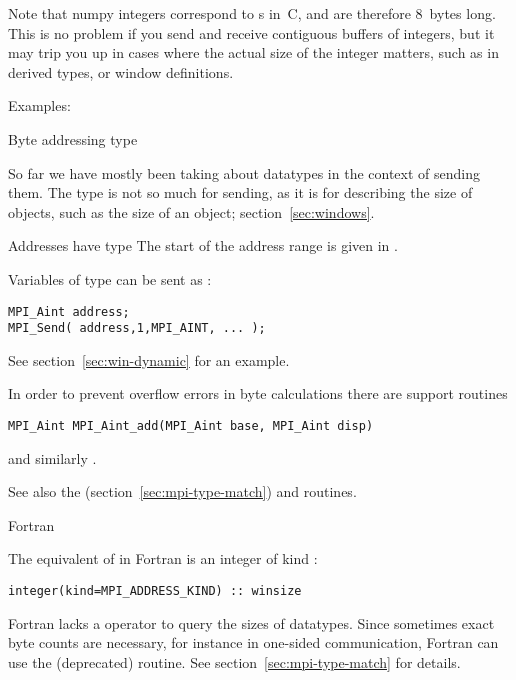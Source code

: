 Note that numpy integers correspond to s in~C,
and are therefore 8~bytes long.
This is no problem if you send and receive contiguous buffers of integers,
but it may trip you up in cases where the actual size of the integer matters,
such as in derived types, or window definitions.

Examples:



 {Byte addressing type}
\label{sec:mpi-byte-type}

So far we have mostly been taking about datatypes in the context of
sending them. The  type is not so much for
sending, as it is for describing the size of objects, such as the size
of an  object; section~\ref{sec:windows}.

Addresses have type  The start of the address range is
given in .

Variables of type  can be sent as :
\begin{lstlisting}
MPI_Aint address;
MPI_Send( address,1,MPI_AINT, ... );
\end{lstlisting}
See section~\ref{sec:win-dynamic} for an example.

In order to prevent overflow errors in byte calculations
there are support routines 
\begin{lstlisting}
MPI_Aint MPI_Aint_add(MPI_Aint base, MPI_Aint disp)
\end{lstlisting}
and similarly .

See also the 
(section~\ref{sec:mpi-type-match})
and
 routines.

 {Fortran}

The equivalent of
 in Fortran
is an integer of kind :
\lstset{style=reviewcode,language=Fortran} %
\begin{lstlisting}
integer(kind=MPI_ADDRESS_KIND) :: winsize
\end{lstlisting}
\lstset{style=reviewcode,language=C} %

Fortran lacks a  operator to query the sizes of datatypes.
Since sometimes exact byte counts are necessary,
for instance in one-sided communication,
Fortran can use the (deprecated)  routine.
See section~\ref{sec:mpi-type-match} for details.

